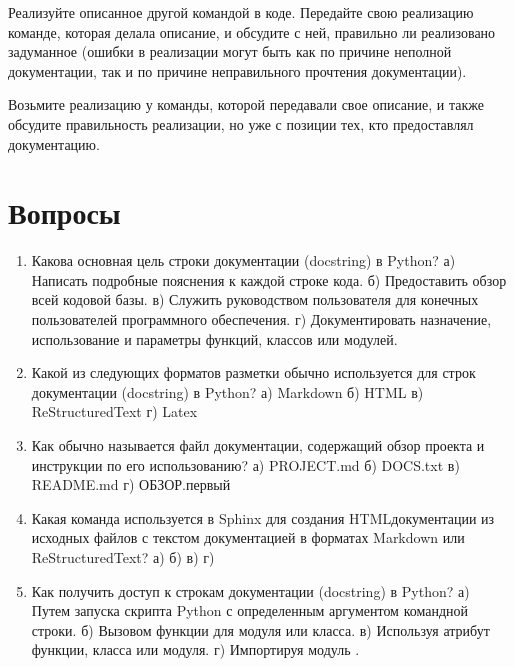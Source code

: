 \documentclass[letterpaper,10pt,russian]{sphinxmanual}
\begin{document}
\sphinxAtStartPar
Реализуйте описанное другой командой в коде. Передайте свою реализацию команде, которая делала описание, и обсудите с ней, правильно ли реализовано задуманное (ошибки в реализации могут быть как по причине неполной документации, так и по причине неправильного прочтения документации).

\sphinxAtStartPar
Возьмите реализацию у команды, которой передавали свое описание, и также обсудите правильность реализации, но уже с позиции тех, кто предоставлял документацию.

\sphinxstepscope


\section{Вопросы}
\label{\detokenize{educational_materials/docs/quiz:id1}}\label{\detokenize{educational_materials/docs/quiz::doc}}\begin{enumerate}
%
\item {} 
\sphinxAtStartPar
Какова основная цель строки документации (docstring) в Python?
а) Написать подробные пояснения к каждой строке кода.
б) Предоставить обзор всей кодовой базы.
в) Служить руководством пользователя для конечных пользователей программного обеспечения.
г) Документировать назначение, использование и параметры функций, классов или модулей.

\item {} 
\sphinxAtStartPar
Какой из следующих форматов разметки обычно используется для строк документации (docstring) в Python?
а) Markdown
б) HTML
в) ReStructuredText
г) Latex

\item {} 
\sphinxAtStartPar
Как обычно называется файл документации, содержащий обзор проекта и инструкции по его использованию?
а) PROJECT.md
б) DOCS.txt
в) README.md
г) ОБЗОР.первый

\item {} 
\sphinxAtStartPar
Какая команда используется в Sphinx для создания HTML\sphinxhyphen{}документации из исходных файлов с текстом документацией в форматах Markdown или ReStructuredText?
а) 
б) 
в) 
г) 

\item {} 
\sphinxAtStartPar
Как получить доступ к строкам документации (docstring) в Python?
а) Путем запуска скрипта Python с определенным аргументом командной строки.
б) Вызовом функции  для модуля или класса.
в) Используя атрибут  функции, класса или модуля.
г) Импортируя модуль .


\end{enumerate}
\end{document}

